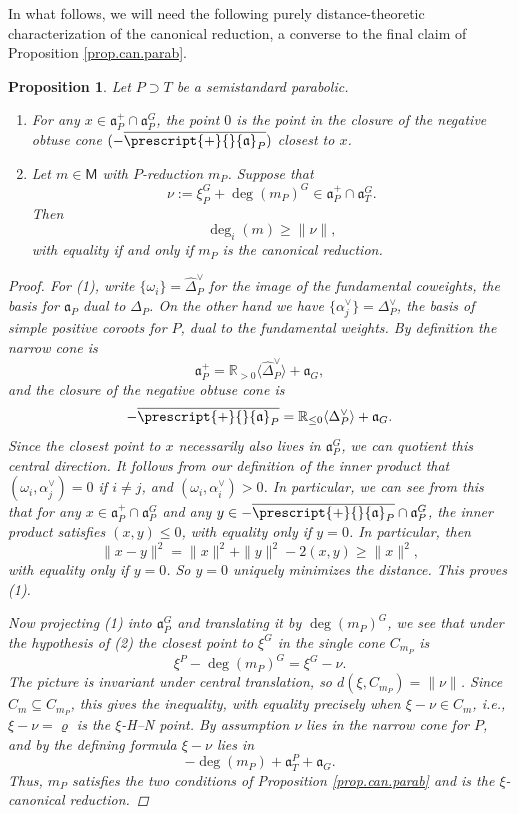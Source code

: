 \documentclass[openany]{amsbook}
\newtheorem{proposition}[theorem]{Proposition}
\theoremstyle{definition}
\theoremstyle{remark}
\numberwithin{equation}{section}
\newcommand{\R}{\mathbb{R}}
\newcommand{\ol}[1]{\overline{#1}}
\renewcommand{\-}{\operatorname{-}}
\renewcommand{\a}{\mathfrak{a}}
\newcommand{\bM}{\mathsf{M}}
\newcommand{\obtcone}{\prescript{+}{}{\a}}
\newcommand{\narcone}{\a^+}
\begin{document}
In what follows, we will need the following purely distance-theoretic characterization of the canonical reduction, a converse to the final claim of Proposition \ref{prop.can.parab}.

\begin{proposition} \label{prop.can.red.dist.characterization}
Let $P \supset T$ be a semistandard parabolic.
    \begin{enumerate}
    \item  For any $x \in \narcone_P \cap \a_P^G$, the point $0$ is the point in the closure of the negative obtuse cone $(- \ol{\obtcone_P})$ closest to $x$.
    \item Let $m \in \bM$ with $P$-reduction $m_P$. Suppose that 
    $$
        \nu := \xi_P^G + \deg(m_P)^G \in \narcone_P \cap \a_T^G.
    $$
    Then
    $$
        \deg_i(m) \ge \|\nu\|,
    $$
    with equality if and only if $m_P$ is the canonical reduction.
    \end{enumerate}
    \begin{proof}
        For (1), write $\{\omega_i\} = \widehat{\Delta}_P^\vee$ for the image of the fundamental coweights, the basis for $\a_P$ dual to $\Delta_P$. On the other hand we have $\{\alpha_j^\vee\} = \Delta_P^\vee$, the basis of simple positive coroots for $P$, dual to the fundamental weights. By definition the narrow cone is
        $$
            \narcone_P = \R_{> 0} \langle \widehat{\Delta}_P^\vee \rangle + \a_G,
        $$
        and the closure of the negative obtuse cone is
        $$
            - \ol{\obtcone_P} = \R_{\le 0} \langle \Delta_P^\vee\rangle + \a_G. 
        $$
        Since the closest point to $x$ necessarily also lives in $\a_P^G$, we can quotient this central direction. It follows from our definition of the inner product that $(\omega_i, \alpha_j^\vee) = 0$ if $i \neq j$, and $(\omega_i, \alpha_i^\vee) > 0$. In particular, we can see from this that for any $x \in \narcone_P \cap \a_P^G$ and any $y \in - \ol{\obtcone_P} \cap \a_P^G$, the inner product satisfies $(x,y) \le 0$, with equality only if $y = 0$. In particular, then
        $$
            \|x - y\|^2 = \|x\|^2 + \|y\|^2 - 2(x,y) \ge \|x\|^2,
        $$
        with equality only if $y = 0$. So $y = 0$ uniquely minimizes the distance. This proves (1).

        Now projecting (1) into $\a_P^G$ and translating it by $\deg(m_P)^G$, we see that under the hypothesis of (2) the closest point to $\xi^G$ in the single cone $C_{m_P}$ is 
        $$
            \xi^P - \deg(m_P)^G = \xi^G - \nu.
        $$
        The picture is invariant under central translation, so $d(\xi, C_{m_P}) = \|\nu\|$. Since $C_m \subseteq C_{m_P}$, this gives the inequality, with equality precisely when $\xi - \nu \in C_m$, i.e., $\xi - \nu = \varrho$ is the $\xi$-H--N point. By assumption $\nu$ lies in the narrow cone for $P$, and by the defining formula $\xi - \nu$ lies in
        $$
            -\deg(m_P) + \a_T^P + \a_G.
        $$
        Thus, $m_P$ satisfies the two conditions of Proposition \ref{prop.can.parab} and is the $\xi$-canonical reduction.
        

\end{proof}
\end{proposition}
\end{document}
